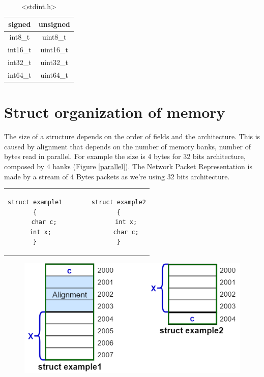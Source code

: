 \begin{table}[h]
\centering
\begin{tabular}{|c|c|}
\hline
\textbf{signed}&\textbf{unsigned}\\
\hline
{int8\_t}&{uint8\_t}\\
{int16\_t}&{uint16\_t}\\
{int32\_t}&{uint32\_t}\\
{int64\_t}&{uint64\_t}\\
\hline
\end{tabular}\caption{<stdint.h>}
\end{table}
\vspace{4cm}
\section{Struct organization of memory}
The size of a structure depends on the order of fields and the architecture. This is caused by alignment that depends on the number of memory banks, number of bytes read in parallel. For example the size is 4 bytes for 32 bits architecture, composed by 4 banks (Figure \ref{parallel}). The Network Packet Representation is made by a stream of 4 Bytes packets as we're using 32 bits architecture. 
\begin{center}
\begin{tabular}{c}
\begin{lstlisting}[linewidth=200pt, basicstyle=\footnotesize\sffamily,]
struct example1        struct example2
{                      {
	char c;	               int x;
	int x;	               char c;
}                      }
\end{lstlisting}
\end{tabular}
\end{center}

\begin{figure}[h]
\centering
\includegraphics[scale=0.5]{Images/Programming/struct}
\end{figure}

